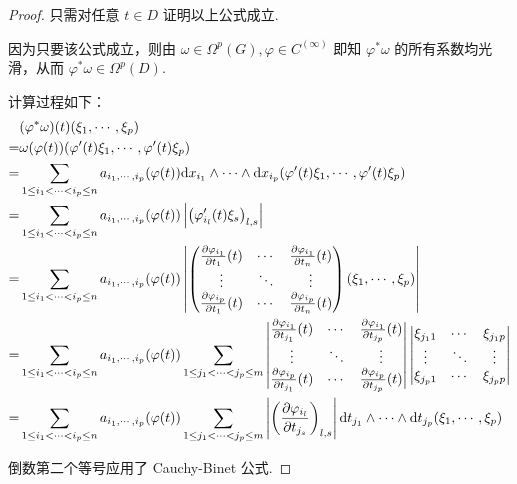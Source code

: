 \begin{proof}
    只需对任意 $t\in D$ 证明以上公式成立.
    
    因为只要该公式成立，则由 $\omega\in\Omega^p(G),\varphi\in C^{(\infty)}$ 即知 $\varphi^*\omega$ 的所有系数均光滑，从而 $\varphi^*\omega\in\Omega^p(D)$.

    计算过程如下：
$$
\begin{aligned}
&(\varphi^*\omega)(t)(\xi_1,\cdots,\xi_p)\\
=&\omega(\varphi(t))(\varphi'(t)\xi_1,\cdots,\varphi'(t)\xi_p)\\
=&\sum_{1\le i_1<\cdots<i_p\le n}a_{i_1,\cdots,i_p}(\varphi(t))\mathrm{d} x_{i_1}\wedge\cdots\wedge\mathrm{d} x_{i_p}(\varphi'(t)\xi_1,\cdots,\varphi'(t)\xi_p)\\
=&\sum_{1\le i_1<\cdots<i_p\le n}a_{i_1,\cdots,i_p}(\varphi(t))\left\lvert\left(\varphi_{i_l}'(t)\xi_s\right)_{l,s}\right\rvert\\
=&\sum_{1\le i_1<\cdots<i_p\le n}a_{i_1,\cdots,i_p}(\varphi(t))\left\lvert\begin{pmatrix}\frac{\partial{\varphi_{i_1}}}{\partial{t_1}}(t) & \cdots & \frac{\partial{\varphi_{i_1}}}{\partial{t_n}}(t)\\\vdots & \ddots & \vdots\\\frac{\partial{\varphi_{i_p}}}{\partial{t_1}}(t) & \cdots & \frac{\partial{\varphi_{i_p}}}{\partial{t_n}}(t)\end{pmatrix}(\xi_1,\cdots,\xi_p)\right\rvert\\
=&\sum_{1\le i_1<\cdots<i_p\le n}a_{i_1,\cdots,i_p}(\varphi(t))\sum_{1\le j_1<\cdots<j_p\le m}\begin{vmatrix}\frac{\partial{\varphi_{i_1}}}{\partial{t_{j_1}}}(t) & \cdots & \frac{\partial{\varphi_{i_1}}}{\partial{t_{j_p}}}(t)\\\vdots & \ddots & \vdots\\\frac{\partial{\varphi_{i_p}}}{\partial{t_{j_1}}}(t) & \cdots & \frac{\partial{\varphi_{i_p}}}{\partial{t_{j_p}}}(t)\end{vmatrix}\begin{vmatrix}\xi_{j_11} & \cdots & \xi_{j_1p}\\\vdots & \ddots & \vdots\\\xi_{j_p1} & \cdots & \xi_{j_pp}\end{vmatrix}\\
=&\sum_{1\le i_1<\cdots<i_p\le n}a_{i_1,\cdots,i_p}(\varphi(t))\sum_{1\le j_1<\cdots<j_p\le m}\left\lvert\left(\frac{\partial{\varphi_{i_l}}}{\partial{t_{j_s}}}\right)_{l,s}\right\rvert\mathrm{d} t_{j_1}\wedge\cdots\wedge\mathrm{d} t_{j_p}(\xi_1,\cdots,\xi_p)\\
\end{aligned}
$$

    倒数第二个等号应用了 Cauchy-Binet 公式.
\end{proof}

